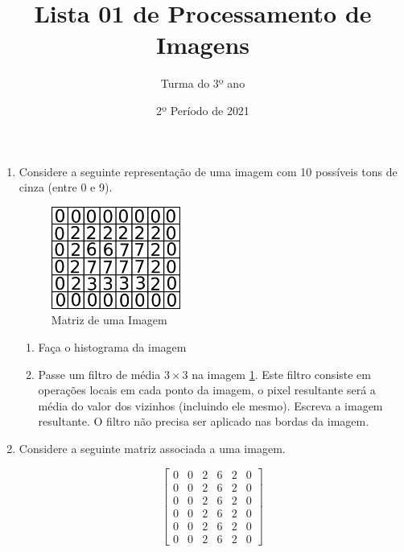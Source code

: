 \documentclass[12pt]{article}
\title{Lista 01 de Processamento de Imagens}
\date{2º Período de 2021}
\author{Turma do 3º ano}
\begin{document}
\maketitle


\vspace{3em}

\begin{enumerate}



\item Considere a seguinte representação de uma imagem com 10 possíveis tons de cinza (entre 0 e 9).

\begin{figure}[h]
    \centering
    \includegraphics[width=0.40\textwidth]{img-matrix}
    \caption{Matriz de uma Imagem}
    \label{fig:img-matrix}
\end{figure}

\begin{enumerate}

\item Faça o histograma da imagem


\item Passe um filtro de média $3\times 3$ na imagem \ref{fig:img-matrix}. 
Este filtro consiste em operações locais em cada ponto da imagem, 
o pixel resultante será a média do valor dos vizinhos (incluindo ele mesmo).
Escreva a imagem resultante. 
O filtro não precisa ser aplicado nas bordas da imagem.


\end{enumerate}


\item Considere a seguinte matriz associada a uma imagem.


\[
\begin{bmatrix}
  0 &  0 &  2 &  6 &  2 &  0 \\
  0 &  0 &  2 &  6 &  2 &  0 \\
  0 &  0 &  2 &  6 &  2 &  0 \\
  0 &  0 &  2 &  6 &  2 &  0 \\
  0 &  0 &  2 &  6 &  2 &  0 \\
  0 &  0 &  2 &  6 &  2 &  0 
\end{bmatrix}
\]




\end{enumerate}
\end{document}
